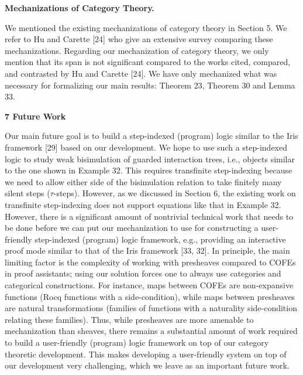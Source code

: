  
 
 
\par\medskip\noindent\textbf{Mechanizations of Category Theory.}\par
 
 
We mentioned the existing mechanizations of category theory in Section 5. We refer to Hu and Carette [24] who give an extensive survey comparing these mechanizations. Regarding our mechanization of category theory, we only mention that its span is not significant compared to the works cited, compared, and contrasted by Hu and Carette [24]. We have only mechanized what was necessary for formalizing our main results: Theorem 23, Theorem 30 and Lemma 33.\par
 
 
 


 
\par\medskip\noindent\textbf{7 Future Work}\par
 
 
Our main future goal is to build a step-indexed (program) logic similar to the Iris framework [29] based on our development. We hope to use such a step-indexed logic to study weak bisimulation of guarded interaction trees, i.e., objects similar to the one shown in Example 32. This requires transfinite step-indexing because we need to allow either side of the bisimulation relation to take finitely many silent steps ($\tau$-steps). However, as we discussed in Section 6, the existing work on transfinite step-indexing does not support equations like that in Example 32. However, there is a significant amount of nontrivial technical work that needs to be done before we can put our mechanization to use for constructing a user-friendly step-indexed (program) logic framework, e.g., providing an interactive proof mode similar to that of the Iris framework [33, 32]. In principle, the main limiting factor is the complexity of working with presheaves compared to COFEs in proof assistants; using our solution forces one to always use categories and categorical constructions. For instance, maps between COFEs are non-expansive functions (Rocq functions with a side-condition), while maps between presheaves are natural transformations (families of functions with a naturality side-condition relating these families). Thus, while presheaves are more amenable to mechanization than sheaves, there remains a substantial amount of work required to build a user-friendly (program) logic framework on top of our category theoretic development. This makes developing a user-friendly system on top of our development very challenging, which we leave as an important future work.\par
 
